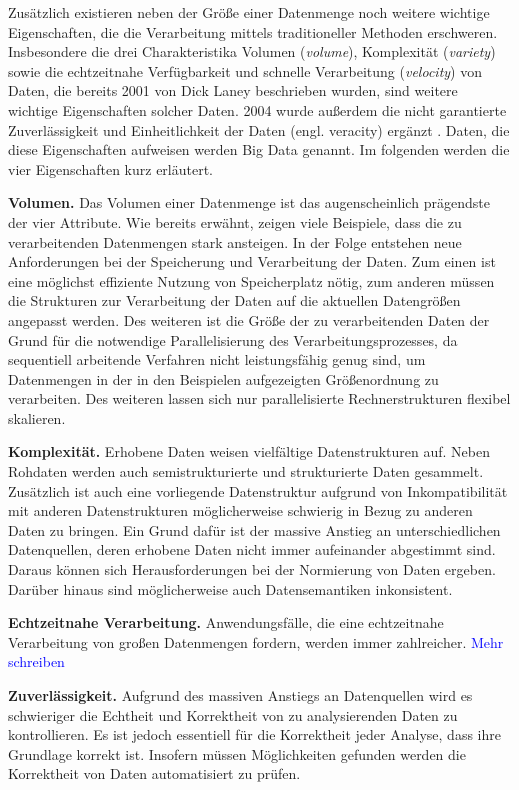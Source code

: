 Zusätzlich existieren neben der Größe einer Datenmenge noch weitere wichtige Eigenschaften, die die Verarbeitung mittels traditioneller Methoden erschweren. Insbesondere die drei Charakteristika Volumen (\textit{volume}), Komplexität (\textit{variety}) sowie die echtzeitnahe Verfügbarkeit und schnelle Verarbeitung (\textit{velocity}) von Daten, die bereits 2001 von Dick Laney beschrieben \cite{Laney2001} wurden, sind weitere wichtige Eigenschaften solcher Daten. 2004 wurde außerdem die nicht garantierte Zuverlässigkeit und Einheitlichkeit der Daten (engl. veracity) ergänzt \cite{Zikopoulos2012}. Daten, die diese Eigenschaften aufweisen werden Big Data genannt. Im folgenden werden die vier Eigenschaften kurz erläutert.

\textbf{Volumen.} Das Volumen einer Datenmenge ist das augenscheinlich prägendste der vier Attribute. Wie bereits erwähnt, zeigen viele Beispiele, dass die zu verarbeitenden Datenmengen stark ansteigen. In der Folge entstehen neue Anforderungen bei der Speicherung und Verarbeitung der Daten. Zum einen ist eine möglichst effiziente Nutzung von Speicherplatz nötig, zum anderen müssen die Strukturen zur Verarbeitung der Daten auf die aktuellen Datengrößen angepasst werden. Des weiteren ist die Größe der zu verarbeitenden Daten der Grund für die notwendige Parallelisierung des Verarbeitungsprozesses, da sequentiell arbeitende Verfahren nicht leistungsfähig genug sind, um Datenmengen in der in den Beispielen aufgezeigten Größenordnung zu verarbeiten. Des weiteren lassen sich nur parallelisierte Rechnerstrukturen flexibel skalieren.

\textbf{Komplexität.} Erhobene Daten weisen vielfältige Datenstrukturen auf. Neben Rohdaten werden auch semistrukturierte und strukturierte Daten gesammelt. Zusätzlich ist auch eine vorliegende Datenstruktur aufgrund von Inkompatibilität mit anderen Datenstrukturen möglicherweise schwierig in Bezug zu anderen Daten zu bringen. Ein Grund dafür ist der massive Anstieg an unterschiedlichen Datenquellen, deren erhobene Daten nicht immer aufeinander abgestimmt sind. Daraus können sich Herausforderungen bei der Normierung von Daten ergeben. Darüber hinaus sind möglicherweise auch Datensemantiken inkonsistent. 

\textbf{Echtzeitnahe Verarbeitung.} Anwendungsfälle, die eine echtzeitnahe Verarbeitung von großen Datenmengen fordern, werden immer zahlreicher. \textcolor{blue}{Mehr schreiben}

\textbf{Zuverlässigkeit.} Aufgrund des massiven Anstiegs an Datenquellen wird es schwieriger die Echtheit und Korrektheit von zu analysierenden Daten zu kontrollieren. Es ist jedoch essentiell für die Korrektheit jeder Analyse, dass ihre Grundlage korrekt ist. Insofern müssen Möglichkeiten gefunden werden die Korrektheit von Daten automatisiert zu prüfen. 

